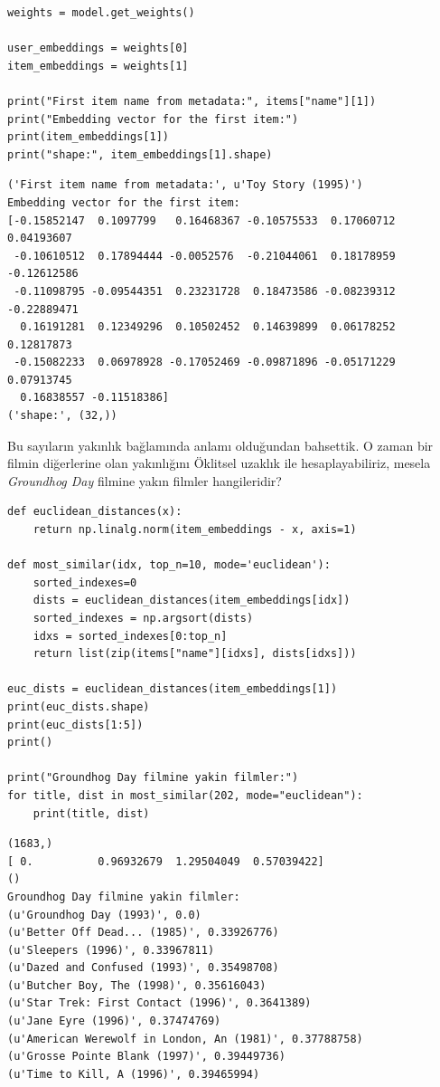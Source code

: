\documentclass[12pt,fleqn]{article}\usepackage{../../common}
\begin{document}
\begin{verbatim}
weights = model.get_weights()

user_embeddings = weights[0]
item_embeddings = weights[1]

print("First item name from metadata:", items["name"][1])
print("Embedding vector for the first item:")
print(item_embeddings[1])
print("shape:", item_embeddings[1].shape)
\end{verbatim}

\begin{verbatim}
('First item name from metadata:', u'Toy Story (1995)')
Embedding vector for the first item:
[-0.15852147  0.1097799   0.16468367 -0.10575533  0.17060712  0.04193607
 -0.10610512  0.17894444 -0.0052576  -0.21044061  0.18178959 -0.12612586
 -0.11098795 -0.09544351  0.23231728  0.18473586 -0.08239312 -0.22889471
  0.16191281  0.12349296  0.10502452  0.14639899  0.06178252  0.12817873
 -0.15082233  0.06978928 -0.17052469 -0.09871896 -0.05171229  0.07913745
  0.16838557 -0.11518386]
('shape:', (32,))
\end{verbatim}

Bu sayıların yakınlık bağlamında anlamı olduğundan bahsettik. O zaman bir
filmin diğerlerine olan yakınlığını Öklitsel uzaklık ile hesaplayabiliriz,
mesela {\em Groundhog Day} filmine yakın filmler hangileridir?

\begin{verbatim}
def euclidean_distances(x):
    return np.linalg.norm(item_embeddings - x, axis=1)

def most_similar(idx, top_n=10, mode='euclidean'):
    sorted_indexes=0
    dists = euclidean_distances(item_embeddings[idx])
    sorted_indexes = np.argsort(dists)
    idxs = sorted_indexes[0:top_n]
    return list(zip(items["name"][idxs], dists[idxs]))

euc_dists = euclidean_distances(item_embeddings[1])
print(euc_dists.shape)
print(euc_dists[1:5])
print()

print("Groundhog Day filmine yakin filmler:")
for title, dist in most_similar(202, mode="euclidean"):
    print(title, dist)
\end{verbatim}

\begin{verbatim}
(1683,)
[ 0.          0.96932679  1.29504049  0.57039422]
()
Groundhog Day filmine yakin filmler:
(u'Groundhog Day (1993)', 0.0)
(u'Better Off Dead... (1985)', 0.33926776)
(u'Sleepers (1996)', 0.33967811)
(u'Dazed and Confused (1993)', 0.35498708)
(u'Butcher Boy, The (1998)', 0.35616043)
(u'Star Trek: First Contact (1996)', 0.3641389)
(u'Jane Eyre (1996)', 0.37474769)
(u'American Werewolf in London, An (1981)', 0.37788758)
(u'Grosse Pointe Blank (1997)', 0.39449736)
(u'Time to Kill, A (1996)', 0.39465994)
\end{verbatim}
\end{document}
